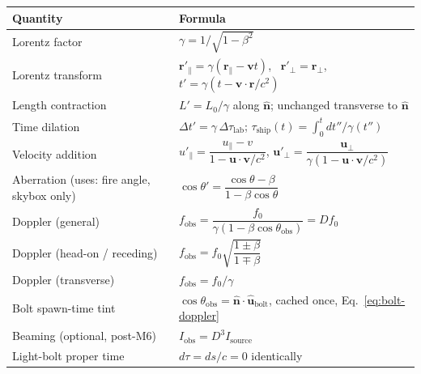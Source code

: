 \documentclass[11pt]{article}
\newcommand{\vb}[1]{\mathbf{#1}}
\newcommand{\uv}[1]{\hat{\mathbf{#1}}}
\newcommand{\pperp}{{\perp}}
\newcommand{\ppar}{{\parallel}}
\begin{document}
\begin{center}
\begin{tabular}{@{}p{4.3cm}p{9.2cm}@{}}
\toprule
\textbf{Quantity} & \textbf{Formula} \\
\midrule
Lorentz factor & $\gamma = 1/\sqrt{1-\beta^2}$ \\[4pt]
Lorentz transform & $\vb r'_\ppar=\gamma(\vb r_\ppar-\vb v t)$, \ $\vb r'_\pperp=\vb r_\pperp$, \ $t'=\gamma(t-\vb v\cdot\vb r/c^2)$ \\[4pt]
Length contraction & $L' = L_0/\gamma$ along $\uv n$; unchanged transverse to $\uv n$ \\[4pt]
Time dilation & $\Delta t' = \gamma\,\Delta\tau_{\text{lab}}$; \quad $\tau_{\text{ship}}(t)=\int_0^t dt''/\gamma(t'')$ \\[4pt]
Velocity addition & $u'_\ppar = \dfrac{u_\ppar-v}{1-\vb u\cdot\vb v/c^2}$, \quad $\vb u'_\pperp = \dfrac{\vb u_\pperp}{\gamma(1-\vb u\cdot\vb v/c^2)}$ \\[8pt]
Aberration (uses: fire angle, skybox only) & $\cos\theta' = \dfrac{\cos\theta-\beta}{1-\beta\cos\theta}$ \\[8pt]
Doppler (general) & $f_{\text{obs}} = \dfrac{f_0}{\gamma(1-\beta\cos\theta_{\text{obs}})} = D f_0$ \\[8pt]
Doppler (head-on / receding) & $f_{\text{obs}} = f_0\sqrt{\dfrac{1\pm\beta}{1\mp\beta}}$ \\[8pt]
Doppler (transverse) & $f_{\text{obs}} = f_0/\gamma$ \\[4pt]
Bolt spawn-time tint & $\cos\theta_{\text{obs}}=\uv n\cdot\uv u_{\text{bolt}}$, cached once, Eq.~\eqref{eq:bolt-doppler} \\[4pt]
Beaming (optional, post-M6) & $I_{\text{obs}} = D^3 I_{\text{source}}$ \\[4pt]
Light-bolt proper time & $d\tau = ds/c = 0$ identically \\
\bottomrule
\end{tabular}
\end{center}
\end{document}
